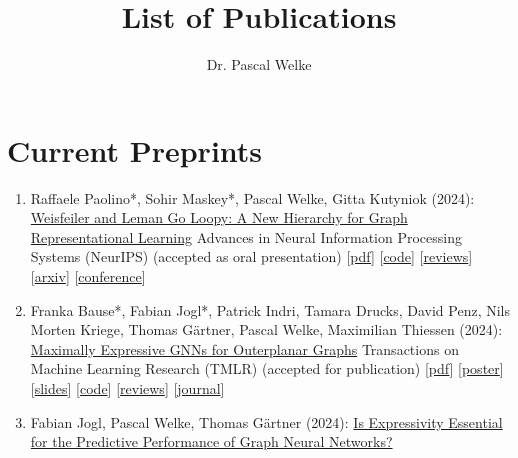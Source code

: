 \documentclass{scrartcl}
\author{Dr. Pascal Welke}
\title{List of Publications}
\begin{document}
\setcounter{saveenumi}{0}
\newcommand{\seti}{\setcounter{saveenumi}{\value{enumi}}}
\newcommand{\conti}{\setcounter{enumi}{\value{saveenumi}}}


\section{Current Preprints}
\begin{enumerate}
\conti
\item
\label{maskey2024loopy}
Raffaele Paolino*, Sohir Maskey*, Pascal Welke, Gitta Kutyniok (2024):\newline
\href{https://pwelke.github.io/publications/paolino2024loopyneurips.pdf}{Weisfeiler and Leman Go Loopy: A New Hierarchy for Graph Representational Learning}\newline
Advances in Neural Information Processing Systems (NeurIPS)\newline
(accepted as oral presentation)\newline
{\footnotesize
[\href{https://pwelke.github.io/publications/paolino2024loopyneurips.pdf}{pdf}]
[\href{https://github.com/RPaolino/loopy}{code}]
[\href{https://openreview.net/forum?id=9O2sVnEHor}{reviews}]
[\href{https://arxiv.org/abs/2403.13749}{arxiv}]
[\href{https://neurips.cc}{conference}]
}
\item
\label{bausejogl2023outerplanarfull}
Franka Bause*, Fabian Jogl*, Patrick Indri, Tamara Drucks, David Penz, Nils Morten Kriege, Thomas Gärtner, Pascal Welke, Maximilian Thiessen (2024):\newline
\href{https://openreview.net/pdf?id=XxbQAsxrRC}{Maximally Expressive GNNs for Outerplanar Graphs}\newline
Transactions on Machine Learning Research (TMLR)\newline
(accepted for publication)\newline
{\footnotesize
[\href{https://openreview.net/pdf?id=XxbQAsxrRC}{pdf}]
[\href{https://pwelke.github.io/publications/bause2023outerplanar-poster.pdf}{poster}]
[\href{https://pwelke.github.io/publications/bause2024outerplanartmlr-slides.pdf}{slides}]
[\href{https://github.com/ocatias/outerplanarGNN}{code}]
[\href{https://openreview.net/forum?id=XxbQAsxrRC}{reviews}]
[\href{https://jmlr.org/tmlr/}{journal}]
}
\item
\label{jogl2024expressivitynotessential}
Fabian Jogl, Pascal Welke, Thomas Gärtner (2024):\newline
\href{https://pwelke.github.io/publications/jogl2024expressivitynotessential.pdf}{Is Expressivity Essential for the Predictive Performance of Graph Neural Networks?}\newline

\end{enumerate}
\end{document}
